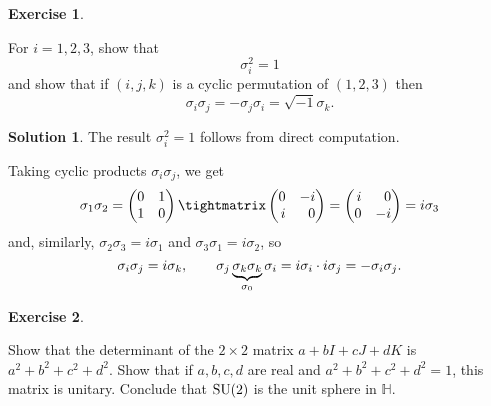 \documentclass[11pt, a4paper]{report}
\theoremstyle{definition}
\newtheorem{exercise}{Exercise}[part]
\newtheorem{solution}{Solution}[part]
\newenvironment{ex}{\begin{exercise}}{\end{exercise}\pagebreak[1]}
\newenvironment{sol}{\begin{solution}}{\end{solution}\pagebreak[3]}
\newcommand*{\SU}{\ensuremath\text{SU}}
\begin{document}
\begin{ex}\label{ex:sigmaisigmajisisigmak}

For $i = 1, 2, 3$, show that
\[
    \sigma_i^2 = 1
\]
and show that if $(i, j, k)$ is a cyclic permutation of $(1, 2, 3)$ then
\[
    \sigma_i \sigma_j = -\sigma_j \sigma_i = \sqrt{-1} \sigma_k.
\]
\end{ex}

\begin{sol}

The result $\sigma_i^2 = 1$ follows from direct computation.

Taking cyclic products $\sigma_i \sigma_j$, we get
\[
    \sigma_1 \sigma_2
    =
    \begin{pmatrix}
        0 & 1 \\
        1 & 0
    \end{pmatrix}
    \tightmatrix
    \begin{pmatrix*}[r]
        0 & -i \\
        i &  0
    \end{pmatrix*}
    =
    \begin{pmatrix*}[r]
        i &  0 \\
        0 & -i
    \end{pmatrix*}
    = i\sigma_3
\]
and, similarly, $\sigma_2 \sigma_3 = i\sigma_1$ and $\sigma_3 \sigma_1 = i \sigma_2$, so
\[
    \sigma_i \sigma_j = i\sigma_k, \qquad
    \sigma_j \underbrace{\sigma_k \sigma_k}_{\sigma_0} \sigma_i
        = i \sigma_i \cdot i \sigma_j \\
        = -\sigma_i \sigma_j.
\]

\end{sol}

\begin{ex}\label{ex:su2isunit3sphere}

Show that the determinant of the $2 \times 2$ matrix $a + bI + cJ + dK$ is $a^2  + b^2 + c^2 + d^2$.
Show that if $a, b, c, d$ are real and $a^2 + b^2 + c^2 + d^2 = 1$, this matrix is unitary.
Conclude that $\SU(2)$ is the unit sphere in $\mathbb{H}$.

\end{ex}
\end{document}
